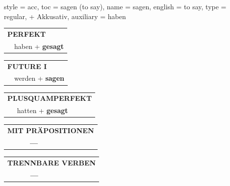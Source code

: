 \begin{verbentry}{
  style = {acc},
  toc = {sagen (to say)},
  name = {sagen},
  english = {to say},
  type = {regular, + Akkusativ},
  auxiliary = {haben}
}
 \begin{tabular}{rl}
     \multicolumn{2}{l}{\textbf{PERFEKT}}\\
   & haben + \textbf{gesagt}\\
  \end{tabular}
\hfill
   \begin{tabular}{rl}
   
    \multicolumn{2}{l}{\textbf{FUTURE I} }\\
  &  werden + \textbf{sagen}\\
 
  \end{tabular}
\hfill
   \begin{tabular}{rl}
      \multicolumn{2}{l}{\textbf{PLUSQUAMPERFEKT}}\\
  &  hatten + \textbf{gesagt}\\
  \end{tabular}
  
  
\vspace{10pt}

\begin{tabular}{lll}
\multicolumn{3}{l}{\textbf{MIT PRÄPOSITIONEN}}\\
& \textbf{---} & \\
\end{tabular}
\hfill
\begin{tabular}{lll}
\multicolumn{3}{l}{\textbf{TRENNBARE VERBEN}}\\
& \textbf{---} & \\
\end{tabular}
\vspace{-5pt}
\end{verbentry}


